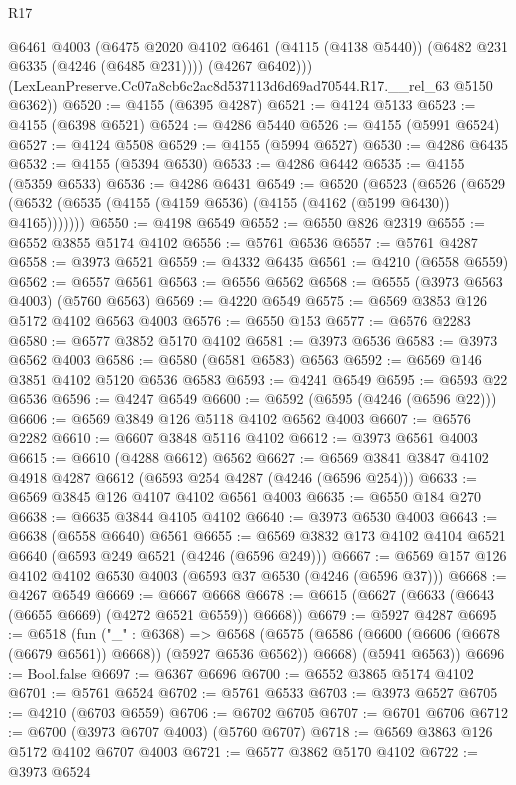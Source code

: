 \begin{lexlean}{R17}
\begin{coremodule}
          @6461
          @4003
          (@6475 @2020 @4102 @6461 (@4115 (@4138 @5440)) (@6482 @231 @6335 (@4246 (@6485 @231))))
          (@4267 @6402)))
      (LexLeanPreserve.Cc07a8cb6c2ac8d537113d6d69ad70544.R17.__rel_63 @5150 @6362))
@6520 := @4155 (@6395 @4287)
@6521 := @4124 @5133
@6523 := @4155 (@6398 @6521)
@6524 := @4286 @5440
@6526 := @4155 (@5991 @6524)
@6527 := @4124 @5508
@6529 := @4155 (@5994 @6527)
@6530 := @4286 @6435
@6532 := @4155 (@5394 @6530)
@6533 := @4286 @6442
@6535 := @4155 (@5359 @6533)
@6536 := @4286 @6431
@6549 := @6520
    (@6523
      (@6526 (@6529 (@6532 (@6535 (@4155 (@4159 @6536) (@4155 (@4162 (@5199 @6430)) @4165)))))))
@6550 := @4198 @6549
@6552 := @6550 @826 @2319
@6555 := @6552 @3855 @5174 @4102
@6556 := @5761 @6536
@6557 := @5761 @4287
@6558 := @3973 @6521
@6559 := @4332 @6435
@6561 := @4210 (@6558 @6559)
@6562 := @6557 @6561
@6563 := @6556 @6562
@6568 := @6555 (@3973 @6563 @4003) (@5760 @6563)
@6569 := @4220 @6549
@6575 := @6569 @3853 @126 @5172 @4102 @6563 @4003
@6576 := @6550 @153
@6577 := @6576 @2283
@6580 := @6577 @3852 @5170 @4102
@6581 := @3973 @6536
@6583 := @3973 @6562 @4003
@6586 := @6580 (@6581 @6583) @6563
@6592 := @6569 @146 @3851 @4102 @5120 @6536 @6583
@6593 := @4241 @6549
@6595 := @6593 @22 @6536
@6596 := @4247 @6549
@6600 := @6592 (@6595 (@4246 (@6596 @22)))
@6606 := @6569 @3849 @126 @5118 @4102 @6562 @4003
@6607 := @6576 @2282
@6610 := @6607 @3848 @5116 @4102
@6612 := @3973 @6561 @4003
@6615 := @6610 (@4288 @6612) @6562
@6627 := @6569 @3841 @3847 @4102 @4918 @4287 @6612 (@6593 @254 @4287 (@4246 (@6596 @254)))
@6633 := @6569 @3845 @126 @4107 @4102 @6561 @4003
@6635 := @6550 @184 @270
@6638 := @6635 @3844 @4105 @4102
@6640 := @3973 @6530 @4003
@6643 := @6638 (@6558 @6640) @6561
@6655 := @6569 @3832 @173 @4102 @4104 @6521 @6640 (@6593 @249 @6521 (@4246 (@6596 @249)))
@6667 := @6569 @157 @126 @4102 @4102 @6530 @4003 (@6593 @37 @6530 (@4246 (@6596 @37)))
@6668 := @4267 @6549
@6669 := @6667 @6668
@6678 := @6615 (@6627 (@6633 (@6643 (@6655 @6669) (@4272 @6521 @6559)) @6668))
@6679 := @5927 @4287
@6695 := @6518
    (fun ("_" : @6368) =>
    @6568
      (@6575 (@6586 (@6600 (@6606 (@6678 (@6679 @6561)) @6668)) (@5927 @6536 @6562)) @6668)
      (@5941 @6563))
@6696 := Bool.false
@6697 := @6367 @6696
@6700 := @6552 @3865 @5174 @4102
@6701 := @5761 @6524
@6702 := @5761 @6533
@6703 := @3973 @6527
@6705 := @4210 (@6703 @6559)
@6706 := @6702 @6705
@6707 := @6701 @6706
@6712 := @6700 (@3973 @6707 @4003) (@5760 @6707)
@6718 := @6569 @3863 @126 @5172 @4102 @6707 @4003
@6721 := @6577 @3862 @5170 @4102
@6722 := @3973 @6524

\end{coremodule}
\end{lexlean}
